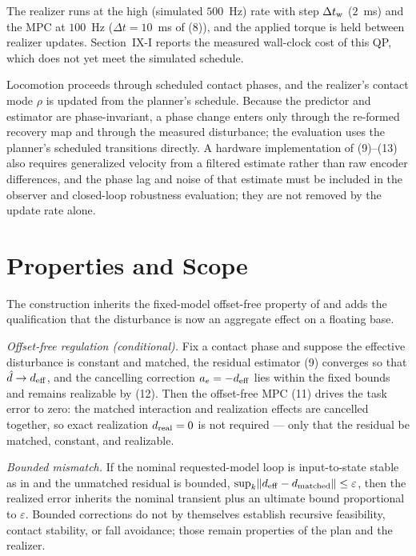 \documentclass[journal]{IEEEtran}
\theoremstyle{plain}
\theoremstyle{definition}
\theoremstyle{remark}
\newcommand{\deff}{d_{\rm eff}}
\begin{document}
The realizer runs at the high (simulated $500$~Hz) rate with step $\Delta t_{\rm w}$ ($2$~ms) and the MPC at $100$~Hz ($\Delta t=10$~ms of (8)), and the applied torque is held between realizer updates. Section~IX-I reports the measured wall-clock cost of this QP, which does not yet meet the simulated schedule.

Locomotion proceeds through scheduled contact phases, and the realizer's contact mode $\rho$ is updated from the planner's schedule. Because the predictor and estimator are phase-invariant, a phase change enters only through the re-formed recovery map and through the measured disturbance; the evaluation uses the planner's scheduled transitions directly. A hardware implementation of (9)--(13) also requires generalized velocity from a filtered estimate rather than raw encoder differences, and the phase lag and noise of that estimate must be included in the observer and closed-loop robustness evaluation; they are not removed by the update rate alone.

\section{Properties and Scope}\label{sec:properties}

The construction inherits the fixed-model offset-free property of \cite{ref1} and adds the qualification that the disturbance is now an aggregate effect on a floating base.

\emph{Offset-free regulation (conditional).} Fix a contact phase and suppose the effective disturbance is constant and matched, the residual estimator (9) converges so that $\hat d\to\deff$, and the cancelling correction $a_e=-\deff$ lies within the fixed bounds and remains realizable by (12). Then the offset-free MPC (11) drives the task error to zero: the matched interaction and realization effects are cancelled together, so exact realization $d_{\rm real}=0$ is not required --- only that the residual be matched, constant, and realizable.

\emph{Bounded mismatch.} If the nominal requested-model loop is input-to-state stable as in \cite{ref1} and the unmatched residual is bounded, $\sup_k\lVert\deff-d_{\rm matched}\rVert\le\varepsilon$, then the realized error inherits the nominal transient plus an ultimate bound proportional to $\varepsilon$. Bounded corrections do not by themselves establish recursive feasibility, contact stability, or fall avoidance; those remain properties of the plan and the realizer.
\end{document}
